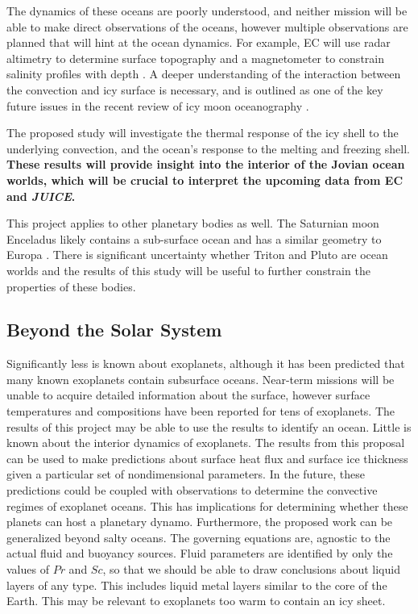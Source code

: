 \documentclass[12pt]{article}
\begin{document}
The dynamics of these oceans are poorly understood, and neither mission will be able to make direct observations of the oceans, however multiple observations are planned that will hint at the ocean dynamics. For example, EC will use radar altimetry to determine surface topography and a magnetometer to constrain salinity profiles with depth \citep{jR23}.  
A deeper understanding of the interaction between the convection and icy surface is necessary, and is outlined as one of the key future issues in the recent review of icy moon oceanography \citep{kS24}.


The proposed study will investigate the thermal response of the icy shell to the underlying convection, and the ocean's response to the melting and freezing shell. 
\textbf{These results will provide insight into the interior of the Jovian ocean worlds, which will be crucial to interpret the upcoming data from EC and \textit{JUICE}.}

This project applies to other planetary bodies as well. The Saturnian moon Enceladus likely contains a sub-surface ocean and has a similar geometry to Europa \citep{kS24}. There is significant uncertainty whether Triton \citep{jK22} and Pluto \citep{kS24} are ocean worlds and the results of this study will be useful to further constrain the properties of these bodies. 

\subsection{Beyond the Solar System}
Significantly less is known about exoplanets, although it has been predicted that many known exoplanets contain subsurface oceans\citep{lQ20}. Near-term missions will be unable to acquire detailed information about the surface, however surface temperatures and compositions have been reported for tens of exoplanets\citep{nM19}. The results of this project may be able to use the results to identify an ocean. 
Little is known about the interior dynamics of exoplanets. The results from this proposal can be used to make predictions about surface heat flux and surface ice thickness given a particular set of nondimensional parameters. In the future, these predictions could be coupled with observations to determine the convective regimes of exoplanet oceans. This has implications for determining whether these planets can host a planetary dynamo\citep{pD11}.
Furthermore, the proposed work can be generalized beyond salty oceans. The governing equations are, agnostic to the actual fluid and buoyancy sources. Fluid parameters are identified by only the values of $Pr$ and $Sc$, so that we should be able to draw conclusions about liquid layers of any type. This includes liquid metal layers similar to the core of the Earth. This may be relevant to exoplanets too warm to contain an icy sheet.
\end{document}

